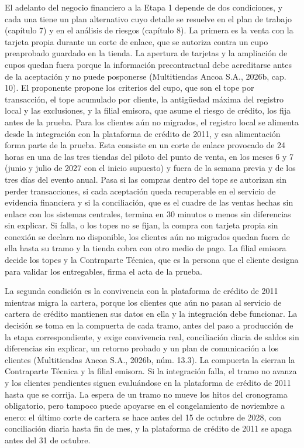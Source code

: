 \documentclass[11pt]{article}
\begin{document}
El adelanto del negocio financiero a la Etapa 1 depende de dos condiciones, y cada una tiene un plan alternativo cuyo detalle se resuelve en el plan de trabajo (capítulo 7) y en el análisis de riesgos (capítulo 8). La primera es la venta con la tarjeta propia durante un corte de enlace, que se autoriza contra un cupo preaprobado guardado en la tienda. La apertura de tarjetas y la ampliación de cupos quedan fuera porque la información precontractual debe acreditarse antes de la aceptación y no puede posponerse (Multitiendas Ancoa S.A., 2026b, cap. 10). El proponente propone los criterios del cupo, que son el tope por transacción, el tope acumulado por cliente, la antigüedad máxima del registro local y las exclusiones, y la filial emisora, que asume el riesgo de crédito, los fija antes de la prueba. Para los clientes aún no migrados, el registro local se alimenta desde la integración con la plataforma de crédito de 2011, y esa alimentación forma parte de la prueba. Esta consiste en un corte de enlace provocado de 24 horas en una de las tres tiendas del piloto del punto de venta, en los meses 6 y 7 (junio y julio de 2027 con el inicio supuesto) y fuera de la semana previa y de los tres días del evento anual. Pasa si las compras dentro del tope se autorizan sin perder transacciones, si cada aceptación queda recuperable en el servicio de evidencia financiera y si la conciliación, que es el cuadre de las ventas hechas sin enlace con los sistemas centrales, termina en 30 minutos o menos sin diferencias sin explicar. Si falla, o los topes no se fijan, la compra con tarjeta propia sin conexión se declara no disponible, los clientes aún no migrados quedan fuera de ella hasta su tramo y la tienda cobra con otro medio de pago. La filial emisora decide los topes y la Contraparte Técnica, que es la persona que el cliente designa para validar los entregables, firma el acta de la prueba.

La segunda condición es la convivencia con la plataforma de crédito de 2011 mientras migra la cartera, porque los clientes que aún no pasan al servicio de cartera de crédito mantienen sus datos en ella y la integración debe funcionar. La decisión se toma en la compuerta de cada tramo, antes del paso a producción de la etapa correspondiente, y exige convivencia real, conciliación diaria de saldos sin diferencias sin explicar, un retorno probado y un plan de comunicación a los clientes (Multitiendas Ancoa S.A., 2026b, núm. 13.3). La compuerta la cierran la Contraparte Técnica y la filial emisora. Si la integración falla, el tramo no avanza y los clientes pendientes siguen evaluándose en la plataforma de crédito de 2011 hasta que se corrija. La espera de un tramo no mueve los hitos del cronograma obligatorio, pero tampoco puede apoyarse en el congelamiento de noviembre a enero: el último corte de cartera se hace antes del 15 de octubre de 2028, con conciliación diaria hasta fin de mes, y la plataforma de crédito de 2011 se apaga antes del 31 de octubre.
\end{document}
